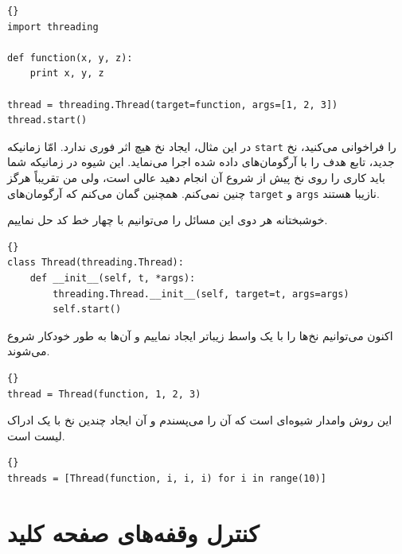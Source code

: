 \documentclass{book}
\begin{document}
\begin{latin}
\begin{lstlisting}[title=\rl{مثال نخ (شیوه معمول)}]{}
import threading

def function(x, y, z):
    print x, y, z

thread = threading.Thread(target=function, args=[1, 2, 3])
thread.start()
\end{lstlisting}
\end{latin}

    در این مثال، ایجاد نخ هیچ اثر فوری ندارد. امّا زمانیکه  {\tt start} را فراخوانی می‌کنید، نخ جدید، تابع هدف را با آرگومان‌های داده شده اجرا می‌نماید. 
    این شیوه در زمانیکه شما باید کاری را روی نخ پیش از شروع آن انجام دهید عالی است،‌ ولی من تقریباً  هرگز چنین نمی‌کنم. 
    همچنین گمان می‌کنم که آرگومان‌های {\tt target} و {\tt args} نازیبا هستند. 

    خوشبختانه هر دوی این مسائل را می‌توانیم با چهار خط کد حل نماییم. 

\begin{latin}
\begin{lstlisting}[title=\rl{کلاس  نخ تمیزکاری  شده}]{}
class Thread(threading.Thread):
    def __init__(self, t, *args):
        threading.Thread.__init__(self, target=t, args=args)
        self.start()
\end{lstlisting}
\end{latin}

    اکنون می‌توانیم نخ‌ها را با یک واسط زیباتر ایجاد نماییم و  آن‌ها به طور خودکار شروع می‌شوند. 

\begin{latin}
\begin{lstlisting}[title=\rl{مثال نخ (به روش من)}]{}
thread = Thread(function, 1, 2, 3)
\end{lstlisting}
\end{latin}

    این روش وامدار شیوه‌ای است که آن را می‌پسندم  و آن ایجاد چندین نخ با یک ادراک لیست است. 
    
    

\begin{latin}
\begin{lstlisting}[title=\rl{مثال چند نخی}]{}
threads = [Thread(function, i, i, i) for i in range(10)]
\end{lstlisting}
\end{latin}

\section{کنترل وقفه‌های صفحه کلید}
\end{document}
